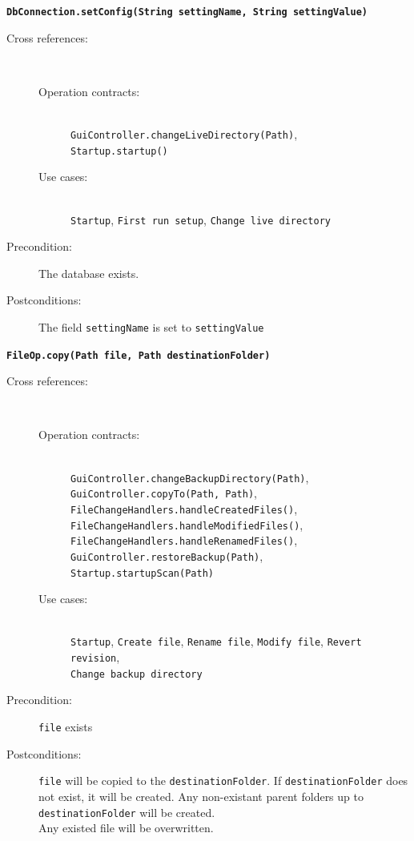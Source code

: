 \documentclass[12pt,a4paper]{article}
\begin{document}
\textbf{\texttt{DbConnection.setConfig(String settingName, String settingValue)}}
\begin{description}
	\item[Cross references:] \hfill \vspace{-4ex}  \\
		\begin{description} 
		\item[Operation contracts:] \hfill \\
			\texttt{GuiController.changeLiveDirectory(Path)},\\
			\texttt{Startup.startup()}
		\item[Use cases:] \hfill \\
			\texttt{Startup}, \texttt{First run setup}, \texttt{Change live directory}
	\end{description}
	\item[Precondition:] The database exists.
	\item[Postconditions:] The field \texttt{settingName} is set to \texttt{settingValue}
\end{description}

\vspace{0.75cm}

\textbf{\texttt{FileOp.copy(Path file, Path destinationFolder)}}
\begin{description}
	\item[Cross references:] \hfill \vspace{-4ex}  \\
		\begin{description} 
		\item[Operation contracts:] \hfill \\
			\texttt{GuiController.changeBackupDirectory(Path)},\\
			\texttt{GuiController.copyTo(Path, Path)},\\
			\texttt{FileChangeHandlers.handleCreatedFiles()}, \\
			\texttt{FileChangeHandlers.handleModifiedFiles()}, \\
			\texttt{FileChangeHandlers.handleRenamedFiles()},\\
			\texttt{GuiController.restoreBackup(Path)},\\
			\texttt{Startup.startupScan(Path)}
		\item[Use cases:] \hfill \\
			\texttt{Startup}, \texttt{Create file}, \texttt{Rename file},
			\texttt{Modify file}, \texttt{Revert revision},\\
			\texttt{Change backup directory}
	\end{description} 	      
	\item[Precondition:] \texttt{file} exists
	\item[Postconditions:] \texttt{file} will be copied to the \texttt{destinationFolder}. If \texttt{destinationFolder} does not exist, it will be created. Any non-existant parent folders up to \texttt{destinationFolder} will be created.\\
	Any existed file will be overwritten.
\end{description}
\end{document}
